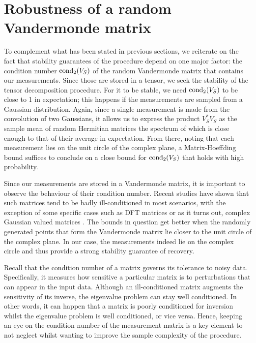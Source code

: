 \section{Robustness of a random Vandermonde matrix}
To complement what has been stated in previous sections, we reiterate on the fact that stability guarantees of the procedure depend on one major factor: the condition number $\operatorname*{cond_2}(V_S)$ of the random Vandermonde matrix that contains our measurements. Since those are stored in a tensor, we seek the stability of the tensor decomposition procedure. For it to be stable, we need $\operatorname*{cond_2}(V_S)$ to be close to 1 in expectation; this happens if the measurements are sampled from a Gaussian distribution. Again, since a single measurement is made from the convolution of two Gaussians, it allows us to express the product $V_S^*V_S$ as the sample mean of random Hermitian matrices the spectrum of which is close enough to that of their average in expectation. From there, noting that each measurement lies on the unit circle of the complex plane, a Matrix-Hoeffding bound suffices to conclude on a close bound for $\operatorname*{cond_2}(V_S)$ that holds with high probability.\par

Since our measurements are stored in a Vandermonde matrix, it is important to observe the behaviour of their condition number. Recent studies have shown that such matrices tend to be badly ill-conditioned in most scenarios, with the exception of some specific cases such as DFT matrices or as it turns out, complex Gaussian valued matrices \cite{vandermondeMatrices}. The bounds in question get better when the randomly generated points that form the Vandermonde matrix lie closer to the unit circle of the complex plane. In our case, the measurements indeed lie on the complex circle and thus provide a strong stability guarantee of recovery.\par

Recall that the condition number of a matrix governs its tolerance to noisy data. Specifically, it measures how sensitive a particular matrix is to perturbations that can appear in the input data. Although an ill-conditioned matrix augments the sensitivity of its inverse, the eigenvalue problem can stay well conditioned. In other words, it can happen that a matrix is poorly conditioned for inversion whilst the eigenvalue problem is well conditioned, or vice versa. Hence, keeping an eye on the condition number of the measurement matrix is a key element to not neglect whilst wanting to improve the sample complexity of the procedure.


